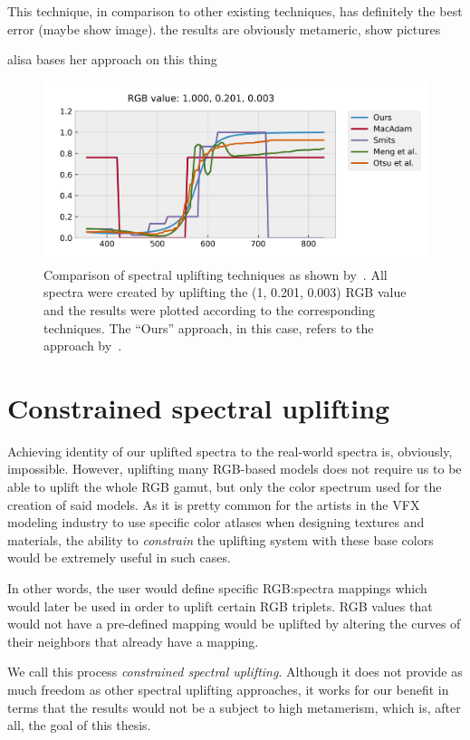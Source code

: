 This technique, in comparison to other existing techniques, has definitely the best error (maybe show image).
the results are obviously metameric, show pictures

alisa bases her approach on this thing

\begin{figure}[t!]
	\centering
	\includegraphics[width=0.8\linewidth]{img/upsampling_techniques.png}
	\caption{Comparison of spectral uplifting techniques as shown by~\citet{upsamplingJakobHanika}. All spectra were created by uplifting the (1, 0.201, 0.003) RGB value and the results were plotted according to the corresponding techniques. The ``Ours'' approach, in this case, refers to the approach by~\cite{upsamplingJakobHanika}.}
	\label{fig:upliftingTechniques}
\end{figure}

\section{Constrained spectral uplifting}

Achieving identity of our uplifted spectra to the real-world spectra is, obviously, impossible. However, uplifting many RGB-based models does not require us to be able to uplift the whole RGB gamut, but only the color spectrum used for the creation of said models. As it is pretty common for the artists in the VFX modeling industry to use specific color atlases when designing textures and materials, the ability to \emph{constrain} the uplifting system with these base colors would be extremely useful in such cases.

In other words, the user would define specific RGB:spectra mappings which would later be used in order to uplift certain RGB triplets. RGB values that would not have a pre-defined mapping would be uplifted by altering the curves of their neighbors that already have a mapping. 

We call this process \emph{constrained spectral uplifting}. Although it does not provide as much freedom as other spectral uplifting approaches, it works for our benefit in terms that the results would not be a subject to high metamerism, which is, after all, the goal of this thesis.

